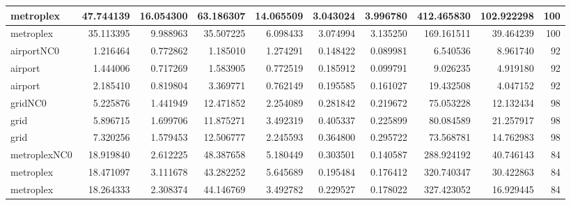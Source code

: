 \begin{longtable}{|l|r|r|r|r|r|r|r|r|r|}
metroplex & 47.744139 & 16.054300 & 63.186307 & 14.065509 & 3.043024 & 3.996780 & 412.465830 & 102.922298 & 100 \\ \hline
metroplex & 35.113395 & 9.988963 & 35.507225 & 6.098433 & 3.074994 & 3.135250 & 169.161511 & 39.464239 & 100 \\ \hline
airportNC0 & 1.216464 & 0.772862 & 1.185010 & 1.274291 & 0.148422 & 0.089981 & 6.540536 & 8.961740 & 92 \\ \hline
airport & 1.444006 & 0.717269 & 1.583905 & 0.772519 & 0.185912 & 0.099791 & 9.026235 & 4.919180 & 92 \\ \hline
airport & 2.185410 & 0.819804 & 3.369771 & 0.762149 & 0.195585 & 0.161027 & 19.432508 & 4.047152 & 92 \\ \hline
gridNC0 & 5.225876 & 1.441949 & 12.471852 & 2.254089 & 0.281842 & 0.219672 & 75.053228 & 12.132434 & 98 \\ \hline
grid & 5.896715 & 1.699706 & 11.875271 & 3.492319 & 0.405337 & 0.225899 & 80.084589 & 21.257917 & 98 \\ \hline
grid & 7.320256 & 1.579453 & 12.506777 & 2.245593 & 0.364800 & 0.295722 & 73.568781 & 14.762983 & 98 \\ \hline
metroplexNC0 & 18.919840 & 2.612225 & 48.387658 & 5.180449 & 0.303501 & 0.140587 & 288.924192 & 40.746143 & 84 \\ \hline
metroplex & 18.471097 & 3.111678 & 43.282252 & 5.645689 & 0.195484 & 0.176412 & 320.740347 & 30.422863 & 84 \\ \hline
metroplex & 18.264333 & 2.308374 & 44.146769 & 3.492782 & 0.229527 & 0.178022 & 327.423052 & 16.929445 & 84 \\ \hline
\end{longtable}
